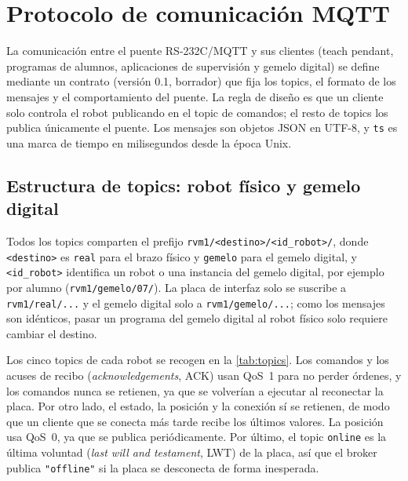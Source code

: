 \section{Protocolo de comunicación MQTT}\label{sec:mqtt}

La comunicación entre el puente RS-232C/MQTT y sus clientes (teach pendant, programas de alumnos, aplicaciones de supervisión y gemelo digital) se define mediante un contrato (versión 0.1, borrador) que fija los topics, el formato de los mensajes y el comportamiento del puente. La regla de diseño es que un cliente solo controla el robot publicando en el topic de comandos; el resto de topics los publica únicamente el puente. Los mensajes son objetos JSON en UTF-8, y \texttt{ts} es una marca de tiempo en milisegundos desde la época Unix.

\subsection{Estructura de topics: robot físico y gemelo digital}

Todos los topics comparten el prefijo \texttt{rvm1/<destino>/<id\_robot>/}, donde \texttt{<destino>} es \texttt{real} para el brazo físico y \texttt{gemelo} para el gemelo digital, y \texttt{<id\_robot>} identifica un robot o una instancia del gemelo digital, por ejemplo por alumno (\texttt{rvm1/gemelo/07/}). La placa de interfaz solo se suscribe a \texttt{rvm1/real/...} y el gemelo digital solo a \texttt{rvm1/gemelo/...}; como los mensajes son idénticos, pasar un programa del gemelo digital al robot físico solo requiere cambiar el destino.

Los cinco topics de cada robot se recogen en la \cref{tab:topics}. Los comandos y los acuses de recibo (\textit{acknowledgements}, ACK) usan QoS~1 para no perder órdenes, y los comandos nunca se retienen, ya que se volverían a ejecutar al reconectar la placa. Por otro lado, el estado, la posición y la conexión sí se retienen, de modo que un cliente que se conecta más tarde recibe los últimos valores. La posición usa QoS~0, ya que se publica periódicamente. Por último, el topic \texttt{online} es la última voluntad (\textit{last will and testament}, LWT) de la placa, así que el broker publica \texttt{"offline"} si la placa se desconecta de forma inesperada.

